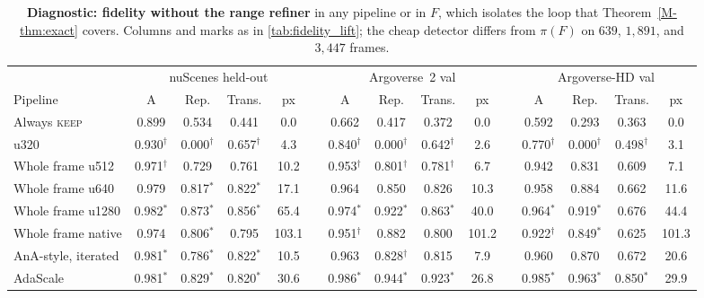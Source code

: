 \documentclass[10pt,letterpaper]{article}
\newcommand{\full}{F}
\newcommand{\policy}{\pi}
\theoremstyle{remark}
\theoremstyle{plain}
\theoremstyle{definition}
\newcommand{\mrefnum}[1]{\ref*{M-#1}}
\begin{document}
\begin{table}[!htbp]
\centering
\caption{\textbf{Diagnostic: fidelity without the range refiner} in any pipeline or in $\full$, which isolates the loop that Theorem~\mrefnum{thm:exact} covers. Columns and marks as in \cref{tab:fidelity_lift}; the cheap detector differs from $\policy(\full)$ on $639$, $1{,}891$, and $3{,}447$ frames.}
\label{tab:fidelity}
\scriptsize
\setlength{\tabcolsep}{2.2pt}
\begin{tabular}{@{}lcccccccccccccc@{}}
\toprule
 & \multicolumn{4}{c}{nuScenes held-out} & & \multicolumn{4}{c}{Argoverse~2 val} & & \multicolumn{4}{c}{Argoverse-HD val} \\
\cmidrule(lr){2-5}\cmidrule(lr){7-10}\cmidrule(l){12-15}
Pipeline & A & Rep. & Trans. & px & & A & Rep. & Trans. & px & & A & Rep. & Trans. & px \\
\midrule
Always \textsc{keep} & 0.899 & 0.534 & 0.441 & 0.0 &  & 0.662 & 0.417 & 0.372 & 0.0 &  & 0.592 & 0.293 & 0.363 & 0.0 \\
u320 & 0.930$^{\dagger}$ & 0.000$^{\dagger}$ & 0.657$^{\dagger}$ & 4.3 &  & 0.840$^{\dagger}$ & 0.000$^{\dagger}$ & 0.642$^{\dagger}$ & 2.6 &  & 0.770$^{\dagger}$ & 0.000$^{\dagger}$ & 0.498$^{\dagger}$ & 3.1 \\
\midrule
Whole frame u512 & 0.971$^{\dagger}$ & 0.729 & 0.761 & 10.2 &  & 0.953$^{\dagger}$ & 0.801$^{\dagger}$ & 0.781$^{\dagger}$ & 6.7 &  & 0.942 & 0.831 & 0.609 & 7.1 \\
Whole frame u640 & 0.979 & 0.817$^{*}$ & 0.822$^{*}$ & 17.1 &  & 0.964 & 0.850 & 0.826 & 10.3 &  & 0.958 & 0.884 & 0.662 & 11.6 \\
Whole frame u1280 & 0.982$^{*}$ & 0.873$^{*}$ & 0.856$^{*}$ & 65.4 &  & 0.974$^{*}$ & 0.922$^{*}$ & 0.863$^{*}$ & 40.0 &  & 0.964$^{*}$ & 0.919$^{*}$ & 0.676 & 44.4 \\
Whole frame native & 0.974 & 0.806$^{*}$ & 0.795 & 103.1 &  & 0.951$^{\dagger}$ & 0.882 & 0.800 & 101.2 &  & 0.922$^{\dagger}$ & 0.849$^{*}$ & 0.625 & 101.3 \\
\midrule
AnA-style, iterated & 0.981$^{*}$ & 0.786$^{*}$ & 0.822$^{*}$ & 10.5 &  & 0.963 & 0.828$^{\dagger}$ & 0.815 & 7.9 &  & 0.960 & 0.870 & 0.672 & 20.6 \\
AdaScale & 0.981$^{*}$ & 0.829$^{*}$ & 0.820$^{*}$ & 30.6 &  & 0.986$^{*}$ & 0.944$^{*}$ & 0.923$^{*}$ & 26.8 &  & 0.985$^{*}$ & 0.963$^{*}$ & 0.850$^{*}$ & 29.9 \\

\end{tabular}
\end{table}
\end{document}

